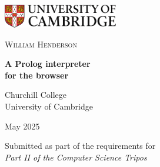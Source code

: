 \begin{titlepage}

\setlength{\baselineskip}{2em}

\centering

\begin{minipage}{0.5\textwidth}
  \includegraphics[width=5cm]{_cambridge.png}
\end{minipage}%
\begin{minipage}[t]{0.5\textwidth}
  \hfill \Large \scshape William Henderson
\end{minipage}

\vspace*{65mm}

{\Huge \bf A Prolog interpreter \\
for the browser}

\vspace*{10mm}

{\Large Churchill College \\
\Large University of Cambridge}

\vspace*{10mm}

{\Large May 2025}

\vspace*{65mm}

{\large Submitted as part of the requirements for} \\
{\large \it Part II of the Computer Science Tripos}

\end{titlepage}